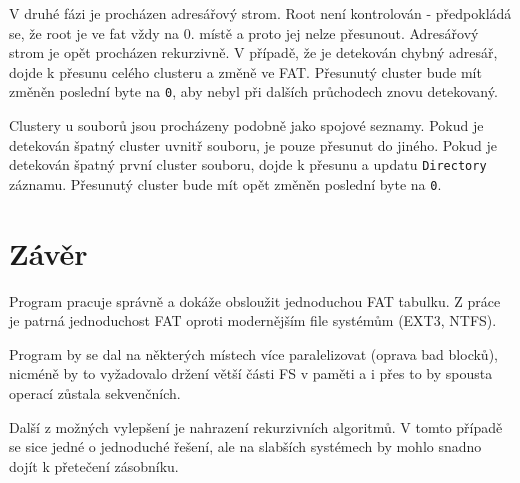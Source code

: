 \documentclass[11pt,a4paper]{scrartcl}
\begin{document}
	V druhé fázi je procházen adresářový strom. Root není kontrolován - předpokládá se, že root je ve fat vždy na 0. místě a proto jej nelze přesunout. Adresářový strom je opět procházen rekurzivně. V případě, že je detekován chybný adresář, dojde k přesunu celého clusteru a změně ve FAT. Přesunutý cluster bude mít změněn poslední byte na \verb|0|, aby nebyl při dalších průchodech znovu detekovaný.
	
	Clustery u souborů jsou procházeny podobně jako spojové seznamy. Pokud je detekován špatný cluster uvnitř souboru, je pouze přesunut do jiného. Pokud je detekován špatný první cluster souboru, dojde k přesunu a updatu \verb|Directory| záznamu. Přesunutý cluster bude mít opět změněn poslední byte na \verb|0|.
	
	\section{Závěr}
	Program pracuje správně a dokáže obsloužit jednoduchou FAT tabulku. Z práce je patrná jednoduchost FAT oproti modernějším file systémům (EXT3, NTFS).
	
	Program by se dal na některých místech více paralelizovat (oprava bad blocků), nicméně by to vyžadovalo držení větší části FS v paměti a i přes to by spousta operací zůstala sekvenčních.
	
	Další z možných vylepšení je nahrazení rekurzivních algoritmů. V tomto případě se sice jedné o jednoduché řešení, ale na slabších systémech by mohlo snadno dojít k přetečení zásobníku.
	
	
	
	
	
\end{document}
